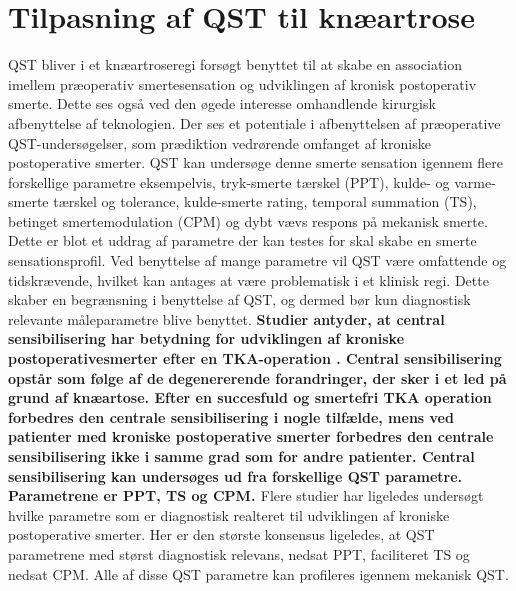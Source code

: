 \section{Tilpasning af QST til knæartrose}
QST bliver i et knæartroseregi forsøgt benyttet til at skabe en association imellem præoperativ smertesensation og udviklingen af kronisk postoperativ smerte. Dette ses også ved den øgede interesse omhandlende kirurgisk afbenyttelse af teknologien. Der ses et potentiale i afbenyttelsen af præoperative QST-undersøgelser, som prædiktion vedrørende omfanget af kroniske postoperative smerter. \citep{Wylde2013} \citep{Lunn2013} QST kan undersøge denne smerte sensation igennem flere forskellige parametre eksempelvis, tryk-smerte tærskel (PPT), kulde- og varme-smerte tærskel og tolerance, kulde-smerte rating, temporal summation (TS), betinget smertemodulation (CPM) og dybt vævs respons på mekanisk smerte. \citep{Cornelius2015} Dette er blot et uddrag af parametre der kan testes for skal skabe en smerte sensationsprofil. Ved benyttelse af mange parametre vil QST være omfattende og tidskrævende, hvilket kan antages at være problematisk i et klinisk regi. Dette skaber en begrænsning i benyttelse af QST, og dermed bør kun diagnostisk relevante måleparametre blive benyttet. \citep{Lunn2013}\textbf{ Studier antyder, at central sensibilisering har betydning for udviklingen af kroniske postoperativesmerter efter en TKA-operation \citep{Suokas2012}. Central sensibilisering opstår som følge af de degenererende forandringer, der sker i et led på grund af knæartose. \citep{Arendt-Nielsen2015}  Efter en succesfuld og smertefri TKA operation forbedres den centrale sensibilisering i nogle tilfælde, mens ved patienter med kroniske postoperative smerter forbedres den centrale sensibilisering ikke i samme grad som for andre patienter. \citep{Arendt-Nielsen2015} Central sensibilisering kan undersøges ud fra forskellige QST parametre. Parametrene er PPT, TS og CPM. \citep{Arendt-Nielsen2015}} Flere studier har ligeledes undersøgt hvilke parametre som er diagnostisk realteret til udviklingen af kroniske postoperative smerter. Her er den største konsensus ligeledes, at QST parametrene med størst diagnostisk relevans, nedsat PPT, faciliteret TS og nedsat CPM. Alle af disse QST parametre kan profileres igennem mekanisk QST. \citep{Petersen2015} \citep{Petersen2016} \citep{Wylde2015} \\
